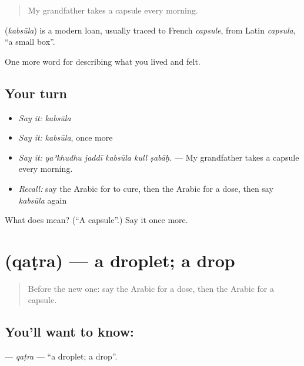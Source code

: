 \begin{quote}
My grandfather takes a capsule every morning.
\end{quote}

\begin{cousinweb}
\textbf{} (\emph{kabsūla}) is a modern loan, usually traced to French \emph{capsule}, from Latin \emph{capsula}, \textquotedblleft{}a small box\textquotedblright{}.
\end{cousinweb}

\begin{grammarlens}[title={What you've built}]
One more word for describing what you lived and felt.
\end{grammarlens}

\subsection*{Your turn}
\begin{itemize}
\raggedright
  \item \emph{Say it:} \emph{kabsūla}
  \item \emph{Say it:} \emph{kabsūla}, once more
  \item \emph{Say it:} \emph{yaʾkhudhu jaddī kabsūla kull ṣabāḥ.} — My grandfather takes a capsule every morning.
  \item \emph{Recall:} say the Arabic for to cure, then the Arabic for a dose, then say \emph{kabsūla} again
\end{itemize}

\begin{tcolorbox}[breakable,colback=teal!4,colframe=teal!35!black,title={Before you move on}]
What does  mean? (\textquotedblleft{}A capsule\textquotedblright{}.) Say it once more.
\end{tcolorbox}
\section[\texorpdfstring{\ar{قطرة} (qaṭra)}{قطرة (qaṭra)}]{ (qaṭra) — a droplet; a drop}

\label{lesson:AR-C511-qatra}



\begin{quote}
Before the new one: say the Arabic for a dose, then the Arabic for a capsule.
\end{quote}

\subsection*{You'll want to know: }
\textbf{} — \emph{qaṭra} — \textquotedblleft{}a droplet; a drop\textquotedblright{}.

